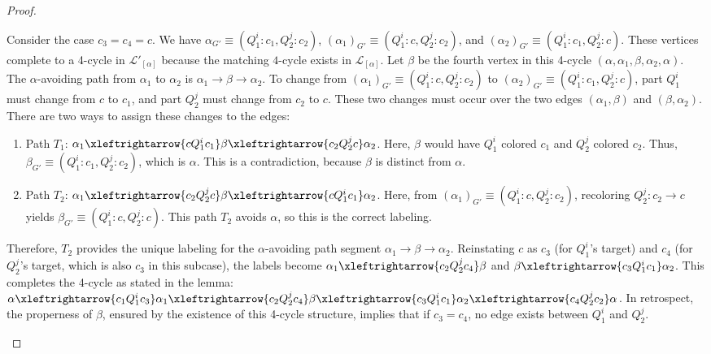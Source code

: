 \documentclass{amsart}
\theoremstyle{hypothesisstyle}
\theoremstyle{definition}
\theoremstyle{remark}
\numberwithin{equation}{section}
\begin{document}
\begin{proof}
\begin{enumerate}
   Consider the case $c_3 = c_4 = c$. We have $\alpha_{G'} \equiv (Q^i_1\colon c_1, Q^j_2\colon c_2)$, $(\alpha_1)_{G'} \equiv (Q^i_1\colon c, Q^j_2\colon c_2)$, and $(\alpha_2)_{G'} \equiv (Q^i_1\colon c_1, Q^j_2\colon c)$. These vertices complete to a 4-cycle in $\mathcal{L}'_{[\alpha]}$ because the matching $4$-cycle exists in $\mathcal{L}_{[\alpha]}$. Let $\beta$ be the fourth vertex in this 4-cycle $(\alpha, \alpha_1, \beta, \alpha_2,\alpha)$.
    The $\alpha$-avoiding path from $\alpha_1$ to $\alpha_2$ is $\alpha_1 \to \beta \to \alpha_2$. To change from $(\alpha_1)_{G'} \equiv (Q^i_1\colon c, Q^j_2\colon c_2)$ to $(\alpha_2)_{G'} \equiv (Q^i_1\colon c_1, Q^j_2\colon c)$, part $Q^i_1$ must change from $c$ to $c_1$, and part $Q^j_2$ must change from $c_2$ to $c$.
    These two changes must occur over the two edges $(\alpha_1, \beta)$ and $(\beta, \alpha_2)$. There are two ways to assign these changes to the edges:
    \begin{enumerate}
        \item Path $T_1$: $\alpha_1 \xleftrightarrow{cQ^i_1c_1} \beta \xleftrightarrow{c_2Q^j_2c} \alpha_2$.
        Here, $\beta$ would have $Q^i_1$ colored $c_1$ and $Q^j_2$ colored $c_2$. Thus, $\beta_{G'} \equiv (Q^i_1\colon c_1, Q^j_2\colon c_2)$, which is $\alpha$. This is a contradiction, because $\beta$ is distinct from $\alpha$.
        \item Path $T_2$: $\alpha_1 \xleftrightarrow{c_2Q^j_2c} \beta \xleftrightarrow{cQ^i_1c_1} \alpha_2$.
        Here, from $(\alpha_1)_{G'} \equiv (Q^i_1\colon c, Q^j_2\colon c_2)$, recoloring $Q^j_2\colon c_2 \to c$ yields $\beta_{G'} \equiv (Q^i_1\colon c, Q^j_2\colon c)$. This path $T_2$ avoids $\alpha$, so this is the correct labeling.
    \end{enumerate}
    Therefore, $T_2$ provides the unique labeling for the $\alpha$-avoiding path segment $\alpha_1 \to \beta \to \alpha_2$. Reinstating $c$ as $c_3$ (for $Q^i_1$'s target) and $c_4$ (for $Q^j_2$'s target, which is also $c_3$ in this subcase), the labels become $\alpha_1 \xleftrightarrow{c_2Q^j_2c_4} \beta$ and $\beta \xleftrightarrow{c_3Q^i_1c_1} \alpha_2$.
    This completes the 4-cycle as stated in the lemma: $\alpha \xleftrightarrow{c_1Q^i_1c_3} \alpha_1 \xleftrightarrow{c_2Q^j_2c_4} \beta \xleftrightarrow{c_3Q^i_1c_1} \alpha_2 \xleftrightarrow{c_4Q^j_2c_2} \alpha$. In retrospect, the properness of $\beta$, ensured by the existence of this 4-cycle structure, implies that if $c_3=c_4$, no edge exists between $Q^i_1$ and $Q^j_2$. \qedhere
\end{enumerate}
\end{proof}
\end{document}
